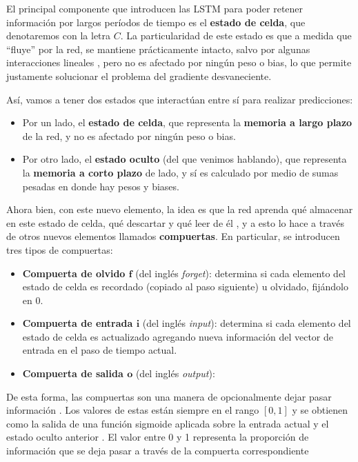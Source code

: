 \documentclass[../../main.tex]{subfiles}
\begin{document}
El principal componente que introducen las LSTM para poder retener información por largos
períodos de tiempo es el \textbf{estado de celda}, que denotaremos con la letra \(C\). La
particularidad de este estado es que a medida que ``fluye'' por la red, se mantiene
prácticamente intacto, salvo por algunas interacciones lineales
\cite{colahs-blog-lstm-2015}, pero no es afectado por ningún peso o bias, lo que permite
justamente solucionar el problema del gradiente desvaneciente.

Así, vamos a tener dos estados que interactúan entre sí para realizar predicciones:
\begin{itemize}
    \item Por un lado, el \textbf{estado de celda}, que representa la \textbf{memoria a largo
    plazo} de la red, y no es afectado por ningún peso o bias.
    \item Por otro lado, el \textbf{estado oculto} (del que venimos hablando), que
    representa la \textbf{memoria a corto plazo} de lado, y sí es calculado por medio
    de sumas pesadas en donde hay pesos y biases.
\end{itemize}

Ahora bien, con este nuevo elemento, la idea es que la red aprenda qué almacenar en este
estado de celda, qué descartar y qué leer de él \cite{hands-on-ML-sklearn-tf}, y a esto lo
hace a través de otros nuevos elementos llamados \textbf{compuertas}. En particular,
se introducen tres tipos de compuertas:
\begin{itemize}
    \item \textbf{Compuerta de olvido \(\bm{f}\)} (del inglés \textit{forget}): determina
    si cada elemento del estado de celda es recordado (copiado al paso siguiente) u
    olvidado, fijándolo en 0.
    \item \textbf{Compuerta de entrada \(\bm{i}\)} (del inglés \textit{input}): determina
    si cada elemento del estado de celda es actualizado agregando nueva información del
    vector de entrada en el paso de tiempo actual.
    \item \textbf{Compuerta de salida \(\bm{o}\)} (del inglés \textit{output}):
\end{itemize}

De esta forma, las compuertas son una manera de opcionalmente dejar pasar información
\cite{colahs-blog-lstm-2015}. Los valores de estas están siempre en el rango \([0,1]\) y
se obtienen como la salida de una función sigmoide aplicada sobre la entrada actual y el
estado oculto anterior \cite{ai-a-modern-approach}. El valor entre 0 y 1 representa
la proporción de información que se deja pasar a través de la compuerta correspondiente
\end{document}
